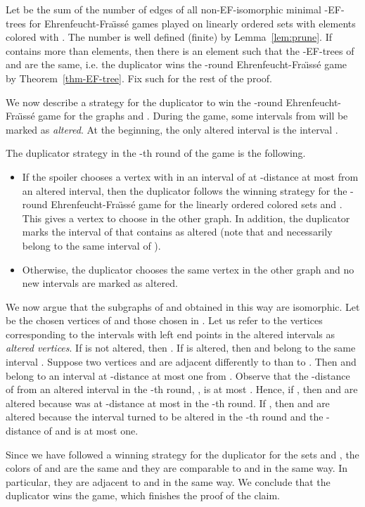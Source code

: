 \documentclass{CSML}
\theoremstyle{plain}\newtheorem{claim}[thm]{Claim}
\begin{document}
Let  be the sum of the number of edges of all non-EF-isomorphic minimal -EF-trees for Ehrenfeucht-Fra{\"\i}ss\'e games
played on linearly ordered sets with elements colored with .
The number  is well defined (finite) by Lemma~\ref{lem:prune}.
If  contains more than  elements, then there is an element  such that
the -EF-trees of  and  are the same, i.e. 
the duplicator wins the -round Ehrenfeucht-Fra{\"\i}ss\'e game by Theorem~\ref{thm-EF-tree}.
Fix such  for the rest of the proof.

We now describe a strategy for the duplicator to win the -round Ehrenfeucht-Fra{\"\i}ss\'e game
for the graphs  and .
During the game, some intervals from  will be marked as {\em altered}.
At the beginning, the only altered interval is the interval .

The duplicator strategy in the -th round of the game is the following.
\begin{itemize}
\item If the spoiler chooses a vertex  with  in an interval of  at -distance
      at most  from an altered interval, then the duplicator follows the winning strategy
      for the -round Ehrenfeucht-Fra{\"\i}ss\'e game for the linearly ordered colored sets  and .
      This gives a vertex  to choose in the other graph.
      In addition, the duplicator marks the interval of  that contains  as altered (note that
       and  necessarily belong to the same interval of ).
\item Otherwise, the duplicator chooses the same vertex in the other graph and no new intervals are marked as altered.
\end{itemize}

\noindent We now argue that the subgraphs of  and  obtained in this way are isomorphic.
Let  be the chosen vertices of  and  those chosen in .
Let us refer to the vertices corresponding to the intervals with left end points in the altered intervals as
{\em altered vertices}.
If  is not altered, then .
If  is altered, then  and  belong to the same interval .
Suppose two vertices  and  are adjacent differently to  than to .
Then  and  belong to an interval  at -distance at most one from .
Observe that the -distance of  from an altered interval in the -th round, , is at most .
Hence, if , then  and  are altered because  was at -distance at most  in the -th round.
If , then  and  are altered
because the interval  turned to be altered in the -th round and the -distance of  and  is at most one.

Since we have followed a winning strategy for the duplicator for the sets  and ,
the colors of  and  are the same and they are comparable to  and  in the same way.
In particular, they are adjacent to  and  in the same way.
We conclude that the duplicator wins the game, which finishes the proof of the claim.
\end{document}
